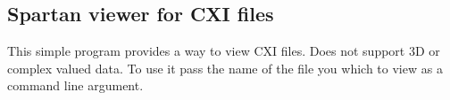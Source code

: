 \documentclass[usletter,11pt]{article}
\begin{document}
\clearpage
\subsection{Spartan viewer for CXI files}

This simple program provides a way to view CXI files. Does not support
3D or complex valued data. To use it pass the name of the file
you which to view as a command line argument.
\end{document}
